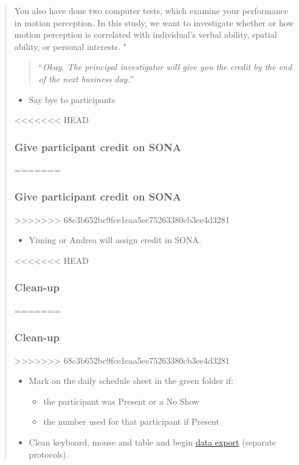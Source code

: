 \documentclass[]{article}
\providecommand{\tightlist}{%
  \setlength{\itemsep}{0pt}\setlength{\parskip}{0pt}}
\begin{document}
\begin{quote}
You also have done two computer tests, which examine your performance in
motion perception. In this study, we want to investigate whether or how
motion perception is correlated with individual's verbal ability,
spatial ability, or personal interests. "

\begin{quote}
``\emph{Okay. The principal investigator will give you the credit by the
end of the next business day.}''
\end{quote}

\begin{itemize}
\tightlist
\item
  Say bye to participants
\end{itemize}

<<<<<<< HEAD
\subsubsection{Give participant credit on
SONA}\label{give-participant-credit-on-sona}
=======
\hypertarget{give-participant-credit-on-sona}{%
\subsubsection{Give participant credit on
SONA}\label{give-participant-credit-on-sona}}
>>>>>>> 68c3b652bc9fce1eaa5ec75263380cb3ee4d3281

\begin{itemize}
\tightlist
\item
  Yiming or Andrea will assign credit in SONA.
\end{itemize}

<<<<<<< HEAD
\subsubsection{Clean-up}\label{clean-up}
=======
\hypertarget{clean-up}{%
\subsubsection{Clean-up}\label{clean-up}}
>>>>>>> 68c3b652bc9fce1eaa5ec75263380cb3ee4d3281

\begin{itemize}
\tightlist
\item
  Mark on the daily schedule sheet in the green folder if:

  \begin{itemize}
  \tightlist
  \item
    the participant was Present or a No Show\\
  \item
    the number used for that participant if Present
  \end{itemize}
\item
  Clean keyboard, mouse and table and begin
  \href{sex-differences-data-export.md}{data export} (separate
  protocols).
\end{itemize}


\end{quote}
\end{document}
